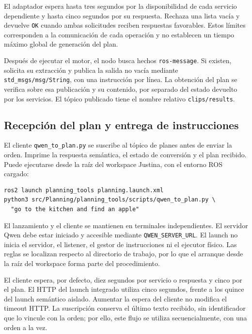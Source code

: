 El adaptador espera hasta tres segundos por la disponibilidad de cada
servicio dependiente y hasta cinco segundos por su respuesta. Rechaza
una lista vacía y devuelve \texttt{OK} cuando ambas solicitudes
reciben respuestas favorables. Estos límites corresponden a la
comunicación de cada operación y no establecen un tiempo máximo
global de generación del plan.

Después de ejecutar el motor, el nodo busca hechos
\texttt{ros-message}. Si existen, solicita su extracción y publica
la salida no vacía mediante \texttt{std\_\allowbreak msgs/\allowbreak msg/\allowbreak String}, con una
instrucción por línea. La obtención del plan se verifica sobre esa
publicación y su contenido, por separado del estado devuelto por los
servicios. El tópico publicado tiene el nombre relativo
\texttt{clips/results}.

\subsection{Recepción del plan y entrega de instrucciones}

El cliente \texttt{qwen\_\allowbreak to\_\allowbreak plan.\allowbreak py} se suscribe al tópico de planes
antes de enviar la orden. Imprime la respuesta semántica, el estado de
conversión y el plan recibido. Puede ejecutarse desde la raíz del
workspace Justina, con el entorno ROS cargado:

{\small
\begin{verbatim}
ros2 launch planning_tools planning.launch.xml
python3 src/Planning/planning_tools/scripts/qwen_to_plan.py \
  "go to the kitchen and find an apple"
\end{verbatim}
}

El lanzamiento y el cliente se mantienen en terminales independientes.
El servidor Qwen debe estar iniciado y accesible mediante
\texttt{QWEN\_\allowbreak SERVER\_\allowbreak URL}. El launch no inicia el servidor, el listener,
el gestor de instrucciones ni el ejecutor físico.
Las reglas se localizan respecto al directorio de trabajo, por lo que
el arranque desde la raíz del workspace forma parte del procedimiento.

El cliente espera, por defecto, diez segundos por servicio o respuesta
y cinco por el plan. El HTTP del launch integrado utiliza cinco segundos,
frente a los quince del launch semántico aislado. Aumentar la espera del
cliente no modifica el timeout HTTP. La suscripción conserva el último
texto recibido, sin identificador que lo vincule con la orden; por ello,
este flujo se utiliza secuencialmente, con una orden a la vez.

